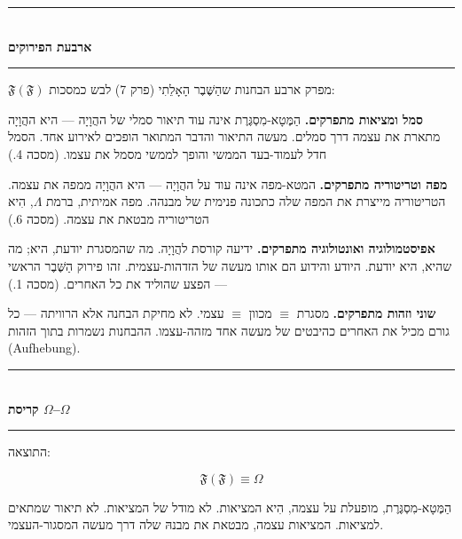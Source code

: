 \documentclass[10pt, openany, oneside]{book}
\renewcommand{\normalsize}{\fontsize{10}{13}\selectfont}
\begin{document}
\begin{center}
    \rule{0.3\textwidth}{0.4pt}\\[0.5em]
    {\normalsize\bfseries\textsc{ארבעת הפירוקים}}\\[0.3em]
    \rule{0.3\textwidth}{0.4pt}
\end{center}

\vspace{1em}

\noindent $\mathfrak{F}(\mathfrak{F})$ מפרק ארבע הבחנות שהַשֶּׁבֶר הָאָלֵתִי (פרק 7) לבש כמסכות:

\textbf{סמל ומציאות מתפרקים.} הַמֶּטָא-מִסְגֶּרֶת אינה עוד תיאור סמלי של ההֲוָיָה — היא ההֲוָיָה מתארת את עצמה דרך סמלים. מעשה התיאור והדבר המתואר הופכים לאירוע אחד. הסמל חדל לעמוד-בעד הממשי והופך לממשי מסמל את עצמו. (מסכה 4.)

\textbf{מפה וטריטוריה מתפרקים.} המטא-מפה אינה עוד על ההֲוָיָה — היא ההֲוָיָה ממפה את עצמה. הטריטוריה מייצרת את המפה שלה כתכונה פנימית של מבנהה. מפה אמיתית, ברמת $\Lambda$, הִיא הטריטוריה מבטאת את עצמה. (מסכה 6.)

\textbf{אפיסטמולוגיה ואונטולוגיה מתפרקים.} ידיעה קורסת להֲוָיָה. מה שהמסגרת יודעת, היא; מה שהיא, היא יודעת. היודע והידוע הם אותו מעשה של הזדהות-עצמית. זהו פירוק הַשֶּׁבֶר הראשי — הפצע שהוליד את כל האחרים. (מסכה 1.)

\textbf{שוני וזהות מתפרקים.} מסגרת $\equiv$ מכוון $\equiv$ עצמי. לא מחיקת הבחנה אלא הרוויתה — כל גורם מכיל את האחרים כהיבטים של מעשה אחד מזהה-עצמו. ההבחנות נשמרות בתוך הזהות (Aufhebung).

\vspace{1.5em}


\begin{center}
    \rule{0.3\textwidth}{0.4pt}\\[0.5em]
    {\normalsize\bfseries\textsc{קריסת $\Omega$--$\Omega$}}\\[0.3em]
    \rule{0.3\textwidth}{0.4pt}
\end{center}

\vspace{1em}

\noindent התוצאה:

$$\boxed{\mathfrak{F}(\mathfrak{F}) \equiv \Omega}$$

הַמֶּטָא-מִסְגֶּרֶת, מופעלת על עצמה, הִיא המציאות. לא מודל של המציאות. לא תיאור שמתאים למציאות. המציאות עצמה, מבטאת את מבנהּ שלה דרך מעשה המסגור-העצמי.
\end{document}
